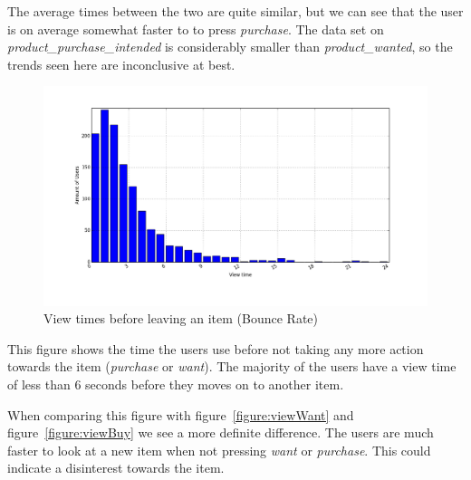        The average times between the two are quite similar, but we can see that the user is on average somewhat faster to to press \emph{purchase}.
        The data set on \emph{product\_purchase\_intended} is considerably smaller than \emph{product\_wanted}, so the trends seen here are inconclusive at best.

    \begin{figure}[H]
        \includegraphics[width=5in]{image/product_detail_clickeddistribution.png}
        \centering
        \caption{View times before leaving an item (Bounce Rate)}
    \label{figure:bounceRate}
    \end{figure}
        This figure shows the time the users use before not taking any more action towards the item (\emph{purchase} or \emph{want}).
        The majority of the users have a view time of less than 6 seconds before they moves on to another item.

        When comparing this figure with figure~\ref{figure:viewWant} and figure~\ref{figure:viewBuy} we see a more definite difference.
        The users are much faster to look at a new item when not pressing \emph{want} or \emph{purchase}.
        This could indicate a disinterest towards the item.

